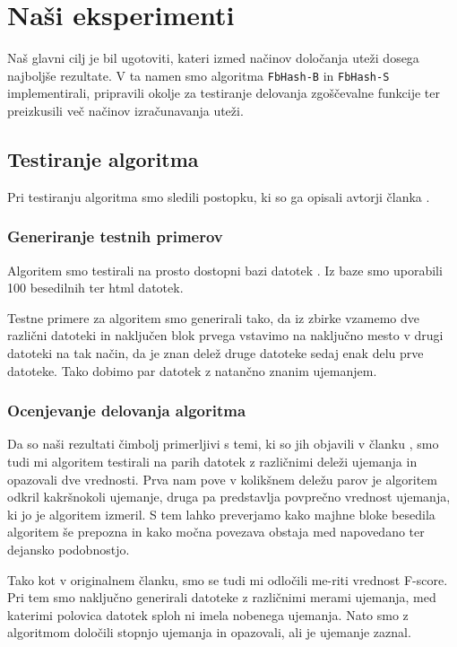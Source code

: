 \documentclass{acm_proc_article-sp}
\begin{document}
\section{Na\v{s}i eksperimenti}
Naš glavni cilj je bil ugotoviti, kateri izmed načinov določanja uteži dosega najboljše rezultate. V ta namen smo algoritma \texttt{FbHash-B} in \texttt{FbHash-S} implementirali, pripravili okolje za testiranje delovanja zgoščevalne funkcije ter preizkusili več načinov izračunavanja uteži.

\subsection{Testiranje algoritma}
Pri testiranju algoritma smo sledili postopku, ki so ga opisali avtorji članka \cite{fbhash}.

\subsubsection{Generiranje testnih primerov}
Algoritem smo testirali na prosto dostopni bazi datotek \cite{dataset}. Iz baze smo uporabili 100 besedilnih ter html datotek.

Testne primere za algoritem smo generirali tako, da iz zbirke vzamemo dve različni datoteki in naključen blok prvega vstavimo na naključno mesto v drugi datoteki na tak način, da je znan delež druge datoteke sedaj enak delu prve datoteke. Tako dobimo par datotek z natančno znanim ujemanjem.

\subsubsection{Ocenjevanje delovanja algoritma}
Da so naši rezultati čimbolj primerljivi s temi, ki so jih objavili v članku \cite{fbhash}, smo tudi mi algoritem testirali na parih datotek z različnimi deleži ujemanja in opazovali dve vrednosti. Prva nam pove v kolikšnem deležu parov je algoritem odkril kakršnokoli ujemanje, druga pa predstavlja povprečno vrednost ujemanja, ki jo je algoritem izmeril. S tem lahko preverjamo kako majhne bloke besedila algoritem še prepozna in kako močna povezava obstaja med napovedano ter dejansko podobnostjo.

Tako kot v originalnem članku, smo se tudi mi odločili me-riti vrednost F-score. Pri tem smo naključno generirali datoteke z različnimi merami ujemanja, med katerimi polovica datotek sploh ni imela nobenega ujemanja. Nato smo z algoritmom določili stopnjo ujemanja in opazovali, ali je ujemanje zaznal.
\end{document}
